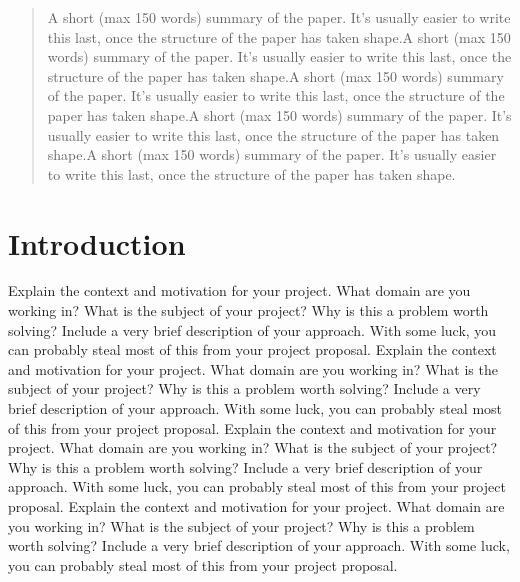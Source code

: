 \documentclass{acm_proc_article-sp}
\begin{document}
\maketitle
\begin{abstract}
A short (max 150 words) summary of the paper. It's usually easier to write this last, once the structure of the paper has taken shape.A short (max 150 words) summary of the paper. It's usually easier to write this last, once the structure of the paper has taken shape.A short (max 150 words) summary of the paper. It's usually easier to write this last, once the structure of the paper has taken shape.A short (max 150 words) summary of the paper. It's usually easier to write this last, once the structure of the paper has taken shape.A short (max 150 words) summary of the paper. It's usually easier to write this last, once the structure of the paper has taken shape.
\end{abstract}




\section{Introduction}
 Explain the context and motivation for your project. What domain are you working in? What is the subject of your project? Why is this a problem worth solving? Include a very brief description of your approach. With some luck, you can probably steal most of this from your project proposal. Explain the context and motivation for your project. What domain are you working in? What is the subject of your project? Why is this a problem worth solving? Include a very brief description of your approach. With some luck, you can probably steal most of this from your project proposal. Explain the context and motivation for your project. What domain are you working in? What is the subject of your project? Why is this a problem worth solving? Include a very brief description of your approach. With some luck, you can probably steal most of this from your project proposal. Explain the context and motivation for your project. What domain are you working in? What is the subject of your project? Why is this a problem worth solving? Include a very brief description of your approach. With some luck, you can probably steal most of this from your project proposal.
\end{document}
